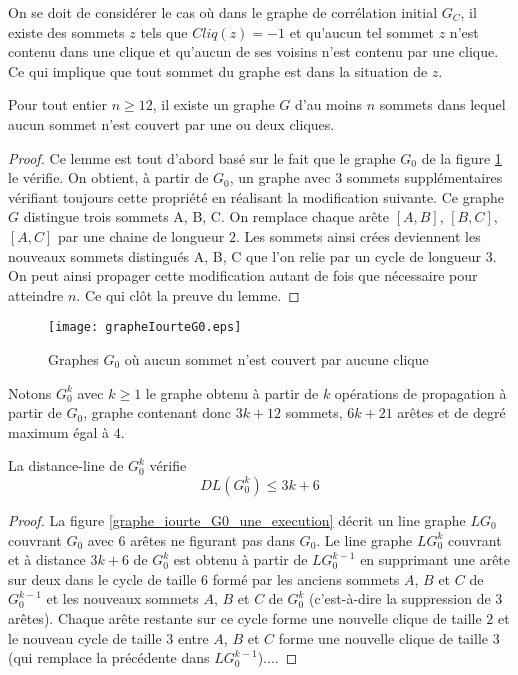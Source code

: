 

On se doit de consid\'erer le cas o\`u dans le graphe de corr\'elation initial $G_C$, il existe des sommets $z$ tels que $Cliq(z) = -1$ et qu'aucun tel sommet $z$ n'est contenu dans une clique et qu'aucun de ses voisins n'est contenu par une clique.
Ce qui implique que tout sommet du graphe est dans la situation de $z$.

\begin{lemma}
Pour tout entier $n \ge 12$, il existe un graphe $G$ d'au moins $n$ sommets dans lequel aucun sommet n'est couvert par une ou deux cliques.
\end{lemma}

\begin{proof}
Ce lemme est tout d'abord bas\'e sur le fait que le graphe $G_0$ de la figure \ref{graphe_iourte_G0} le v\'erifie.
On obtient, \`a partir de $G_0$, un graphe avec $3$ sommets suppl\'ementaires v\'erifiant toujours cette propri\'et\'e en r\'ealisant la modification suivante. 
Ce graphe $G$ distingue trois sommets A, B, C. 
On remplace chaque ar\^ete $[A,B]$, $[B,C]$, $[A,C]$ par une chaine de longueur $2$.
Les sommets ainsi cr\'ees deviennent les nouveaux sommets distingu\'es A, B, C que l'on relie par un cycle de longueur $3$.
On peut ainsi propager cette modification autant de fois que n\'ecessaire pour atteindre $n$.
Ce qui cl\^ot la preuve du lemme.
\end{proof}

\begin{centering} \vspace{-0.5em}
\begin{figure}[htb!] \vspace{-0.5em}
\texttt{[image: grapheIourteG0.eps]}
\caption{ Graphes $G_0$ o\`u aucun sommet n'est couvert par aucune clique }
\label{graphe_iourte_G0} 
\end{figure}
\end{centering} 

Notons $G_0^k$ avec $k \ge 1$ le graphe obtenu \`a partir de $k$ op\'erations de propagation \`a partir de $G_0$, graphe contenant donc $3k+12$ sommets, $6k+21$ ar\^etes et de degr\'e maximum \'egal \`a $4$.

\begin{theorem}
La distance-line de $G_0^k$ v\'erifie
$$ DL(G_0^k) \le 3k+6 $$
\end{theorem}

\begin{proof}
La figure \ref{graphe_iourte_G0_une_execution} d\'ecrit un line graphe $LG_0$ couvrant $G_0$ avec $6$ ar\^etes ne figurant pas dans $G_0$.
Le line graphe $LG_0^k$ couvrant et \`a distance $3k+6$ de $G_0^k$ est obtenu \`a partir  de $LG_0^{k-1}$ en supprimant une ar\^ete sur deux dans le cycle de taille $6$ form\'e par les anciens sommets $A$, $B$ et $C$ de $G_0^{k-1}$ et les nouveaux sommets $A$, $B$ et $C$ de $G_0^{k}$ (c'est-\`a-dire la suppression de $3$ ar\^etes).
Chaque ar\^ete restante sur ce cycle forme une nouvelle clique de taille $2$ et le nouveau cycle de taille $3$ entre $A$, $B$ et $C$  forme une nouvelle clique de taille $3$ (qui remplace la pr\'ec\'edente dans $LG_0^{k-1}$)....
\end{proof}

